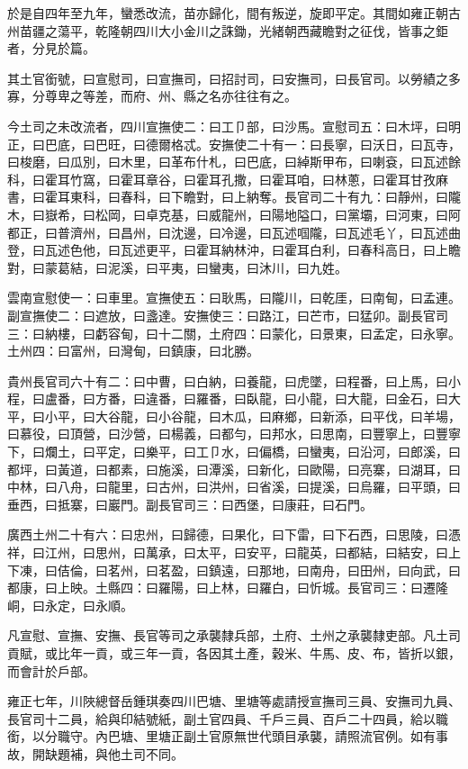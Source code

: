 \begin{pinyinscope}
於是自四年至九年，蠻悉改流，苗亦歸化，間有叛逆，旋即平定。其間如雍正朝古州苗疆之蕩平，乾隆朝四川大小金川之誅鋤，光緒朝西藏瞻對之征伐，皆事之鉅者，分見於篇。

其土官銜號，曰宣慰司，曰宣撫司，曰招討司，曰安撫司，曰長官司。以勞績之多寡，分尊卑之等差，而府、州、縣之名亦往往有之。

今土司之未改流者，四川宣撫使二：曰工⼙部，曰沙馬。宣慰司五：曰木坪，曰明正，曰巴底，曰巴旺，曰德爾格忒。安撫使二十有一：曰長寧，曰沃日，曰瓦寺，曰梭磨，曰瓜別，曰木里，曰革布什札，曰巴底，曰綽斯甲布，曰喇袞，曰瓦述餘科，曰霍耳竹窩，曰霍耳章谷，曰霍耳孔撒，曰霍耳咱，曰林蔥，曰霍耳甘孜麻書，曰霍耳東科，曰春科，曰下瞻對，曰上納奪。長官司二十有九：曰靜州，曰隴木，曰嶽希，曰松岡，曰卓克基，曰威龍州，曰陽地隘口，曰黨壩，曰河東，曰阿都正，曰普濟州，曰昌州，曰沈邊，曰冷邊，曰瓦述啯隴，曰瓦述毛丫，曰瓦述曲登，曰瓦述色他，曰瓦述更平，曰霍耳納林沖，曰霍耳白利，曰春科高日，曰上瞻對，曰蒙葛結，曰泥溪，曰平夷，曰蠻夷，曰沐川，曰九姓。

雲南宣慰使一：曰車里。宣撫使五：曰耿馬，曰隴川，曰乾厓，曰南甸，曰孟連。副宣撫使二：曰遮放，曰盞達。安撫使三：曰路江，曰芒市，曰猛卯。副長官司三：曰納樓，曰虧容甸，曰十二關，土府四：曰蒙化，曰景東，曰孟定，曰永寧。土州四：曰富州，曰灣甸，曰鎮康，曰北勝。

貴州長官司六十有二：曰中曹，曰白納，曰養龍，曰虎墜，曰程番，曰上馬，曰小程，曰盧番，曰方番，曰違番，曰羅番，曰臥龍，曰小龍，曰大龍，曰金石，曰大平，曰小平，曰大谷龍，曰小谷龍，曰木瓜，曰麻鄉，曰新添，曰平伐，曰羊場，曰慕役，曰頂營，曰沙營，曰楊義，曰都勻，曰邦水，曰思南，曰豐寧上，曰豐寧下，曰爛土，曰平定，曰樂平，曰工⼙水，曰偏橋，曰蠻夷，曰沿河，曰郎溪，曰都坪，曰黃道，曰都素，曰施溪，曰潭溪，曰新化，曰歐陽，曰亮寨，曰湖耳，曰中林，曰八舟，曰龍里，曰古州，曰洪州，曰省溪，曰提溪，曰烏羅，曰平頭，曰垂西，曰抵寨，曰巖門。副長官司三：曰西堡，曰康莊，曰石門。

廣西土州二十有六：曰忠州，曰歸德，曰果化，曰下雷，曰下石西，曰思陵，曰憑祥，曰江州，曰思州，曰萬承，曰太平，曰安平，曰龍英，曰都結，曰結安，曰上下凍，曰佶倫，曰茗州，曰茗盈，曰鎮遠，曰那地，曰南舟，曰田州，曰向武，曰都康，曰上映。土縣四：曰羅陽，曰上林，曰羅白，曰忻城。長官司三：曰遷隆峒，曰永定，曰永順。

凡宣慰、宣撫、安撫、長官等司之承襲隸兵部，土府、土州之承襲隸吏部。凡土司貢賦，或比年一貢，或三年一貢，各因其土產，穀米、牛馬、皮、布，皆折以銀，而會計於戶部。

雍正七年，川陜總督岳鍾琪奏四川巴塘、里塘等處請授宣撫司三員、安撫司九員、長官司十二員，給與印結號紙，副土官四員、千戶三員、百戶二十四員，給以職銜，以分職守。內巴塘、里塘正副土官原無世代頭目承襲，請照流官例。如有事故，開缺題補，與他土司不同。


\end{pinyinscope}
